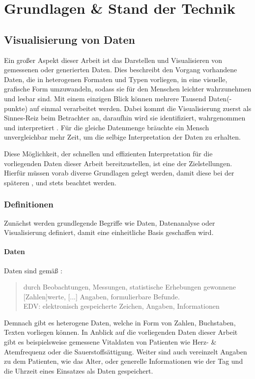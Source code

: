 \chapter{Grundlagen \& Stand der Technik}
\label{kap:Grundlagen}
\minitoc\pagebreak


\section{Visualisierung von Daten}
\label{sec:visual}
Ein großer Aspekt dieser Arbeit ist das Darstellen und Visualisieren von gemessenen oder generierten Daten.
Dies beschreibt den Vorgang vorhandene Daten, die in heterogenen Formaten und Typen vorliegen, in eine visuelle, grafische Form umzuwandeln, sodass sie für den Menschen leichter wahrzunehmen und lesbar sind.
Mit einem einzigen Blick können mehrere Tausend Daten(-punkte) auf einmal verarbeitet werden.
Dabei kommt die Visualisierung zuerst als Sinnes-Reiz beim Betrachter an, daraufhin wird sie identifiziert, wahrgenommen und interpretiert \cite{Goldstein.2015, FischerStabel.2018}.
Für die gleiche Datenmenge bräuchte ein Mensch unvergleichbar mehr Zeit, um die selbige Interpretation der Daten zu erhalten.

Diese Möglichkeit, der schnellen und effizienten Interpretation für die vorliegenden Daten dieser Arbeit  bereitzustellen, ist eine der Zielstellungen.
Hierfür müssen vorab diverse Grundlagen gelegt werden, damit diese bei der späteren ,  und  stets beachtet werden.

\subsection{Definitionen}
Zunächst werden grundlegende Begriffe wie Daten, Datenanalyse oder Visualisierung definiert, damit eine einheitliche Basis geschaffen wird.
\subsubsection{Daten}
Daten sind gemäß \cite{Dudenredaktion.2015}:
\begin{quote}
\glqq durch Beobachtungen, Messungen, statistische Erhebungen gewonnene [Zahlen]werte, [...] Angaben, formulierbare Befunde. \\
EDV: elektronisch gespeicherte Zeichen, Angaben, Informationen\grqq{}
\end{quote}

Demnach gibt es heterogene Daten, welche in Form von Zahlen, Buchstaben, Texten vorliegen können.
In Anblick auf die vorliegenden Daten dieser Arbeit gibt es beispielsweise gemessene Vitaldaten von Patienten wie Herz- \& Atemfrequenz oder die Sauerstoffsättigung.
Weiter sind auch vereinzelt Angaben zu dem Patienten, wie das Alter, oder generelle Informationen wie der Tag und die Uhrzeit eines Einsatzes als Daten gespeichert.
 
